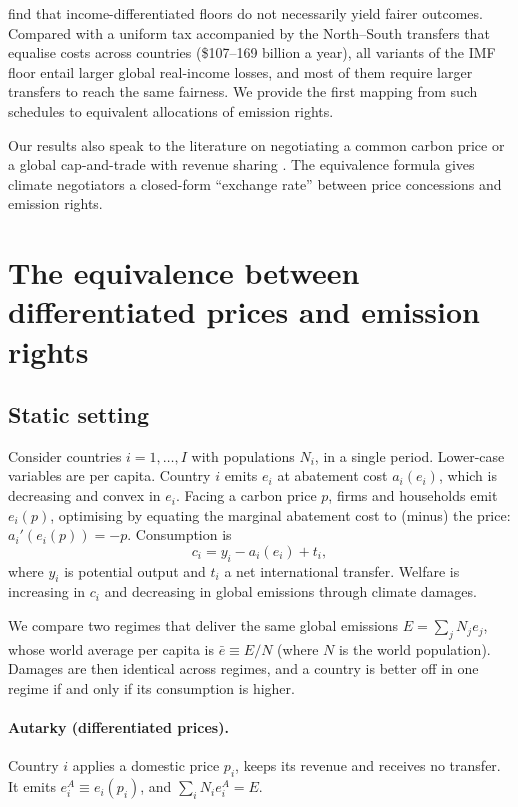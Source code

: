 \documentclass[12pt,english]{article}
\theoremstyle{remark}
\begin{document}
\citet{le_moigne_distributional_2026} find that income-differentiated floors do not necessarily yield fairer outcomes. Compared with a uniform tax accompanied by the North--South transfers that equalise costs across countries (\$107--169 billion a year), all variants of the IMF floor entail larger global real-income losses, and most of them require larger transfers to reach the same fairness. We provide the first mapping from such schedules to equivalent allocations of emission rights.

Our results also speak to the literature on negotiating a common carbon price or a global cap-and-trade with revenue sharing \citep{grubb_greenhouse_1990,weitzman_can_2014,gollier_negotiating_2015,cramton_global_2017,nordhaus_climate_2015,fabre_global_2024}. The equivalence
formula gives climate negotiators a closed-form  ``exchange rate'' between price
concessions and emission rights.
\section{The equivalence between differentiated prices and emission rights}
\label{sec:theory}

\subsection{Static setting}

Consider countries $i=1,\dots,I$ with populations $N_i$,
in a single period. Lower-case variables are per capita. Country $i$ emits $e_i$ at abatement cost $a_i(e_i)$, which is decreasing and convex in $e_i$. Facing a carbon price $p$, firms and households emit $e_i(p)$, optimising by equating the marginal abatement cost to (minus) the price: $a_i'(e_i(p)) = -p$. Consumption is
\begin{equation}
  c_i = y_i - a_i(e_i) + t_i,
\end{equation}
where $y_i$ is potential output and $t_i$ a net international transfer. Welfare is increasing in $c_i$ and decreasing in global emissions through climate damages.

We compare two regimes that deliver the same global emissions $E=\sum_j N_j e_j$, whose world average per capita is $\bar e\equiv E/N$ (where $N$ is the world population).
Damages are then identical across regimes, and a country is better off in one regime if and only if its consumption is higher.

\paragraph{Autarky (differentiated prices).} Country $i$ applies a domestic price $p_i$, keeps its revenue and receives no transfer. It emits $e^A_i \equiv e_i(p_i)$, and $\sum_i N_i e^A_i = E$.
\end{document}
